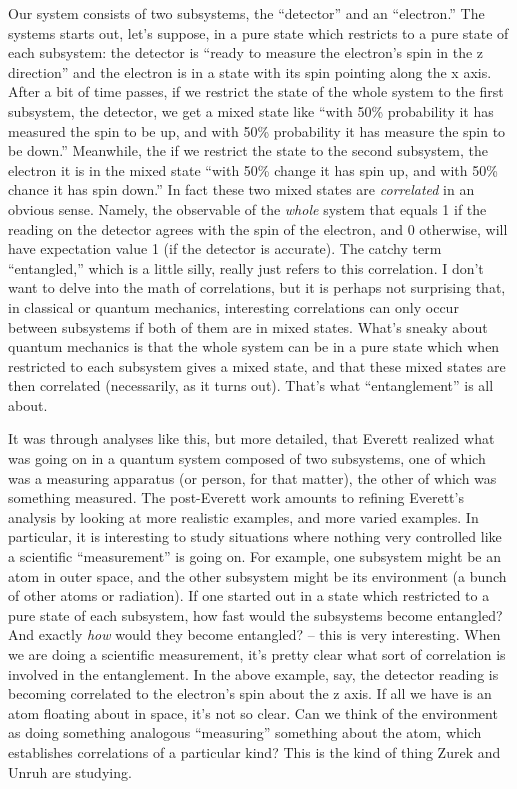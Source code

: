 \documentclass{article}
\begin{document}
Our system consists of two subsystems, the ``detector'' and an
``electron.'' The systems starts out, let's suppose, in a pure state
which restricts to a pure state of each subsystem: the detector is
``ready to measure the electron's spin in the z direction'' and the
electron is in a state with its spin pointing along the x axis. After a
bit of time passes, if we restrict the state of the whole system to the
first subsystem, the detector, we get a mixed state like ``with 50\%
probability it has measured the spin to be up, and with 50\% probability
it has measure the spin to be down.'' Meanwhile, the if we restrict the
state to the second subsystem, the electron it is in the mixed state
``with 50\% change it has spin up, and with 50\% chance it has spin
down.'' In fact these two mixed states are \emph{correlated} in an
obvious sense. Namely, the observable of the \emph{whole} system that
equals 1 if the reading on the detector agrees with the spin of the
electron, and 0 otherwise, will have expectation value 1 (if the
detector is accurate). The catchy term ``entangled,'' which is a little
silly, really just refers to this correlation. I don't want to delve
into the math of correlations, but it is perhaps not surprising that, in
classical or quantum mechanics, interesting correlations can only occur
between subsystems if both of them are in mixed states. What's sneaky
about quantum mechanics is that the whole system can be in a pure state
which when restricted to each subsystem gives a mixed state, and that
these mixed states are then correlated (necessarily, as it turns out).
That's what ``entanglement'' is all about.

It was through analyses like this, but more detailed, that Everett
realized what was going on in a quantum system composed of two
subsystems, one of which was a measuring apparatus (or person, for that
matter), the other of which was something measured. The post-Everett
work amounts to refining Everett's analysis by looking at more realistic
examples, and more varied examples. In particular, it is interesting to
study situations where nothing very controlled like a scientific
``measurement'' is going on. For example, one subsystem might be an atom
in outer space, and the other subsystem might be its environment (a
bunch of other atoms or radiation). If one started out in a state which
restricted to a pure state of each subsystem, how fast would the
subsystems become entangled? And exactly \emph{how} would they become
entangled? -- this is very interesting. When we are doing a scientific
measurement, it's pretty clear what sort of correlation is involved in
the entanglement. In the above example, say, the detector reading is
becoming correlated to the electron's spin about the z axis. If all we
have is an atom floating about in space, it's not so clear. Can we think
of the environment as doing something analogous ``measuring'' something
about the atom, which establishes correlations of a particular kind?
This is the kind of thing Zurek and Unruh are studying.
\end{document}
